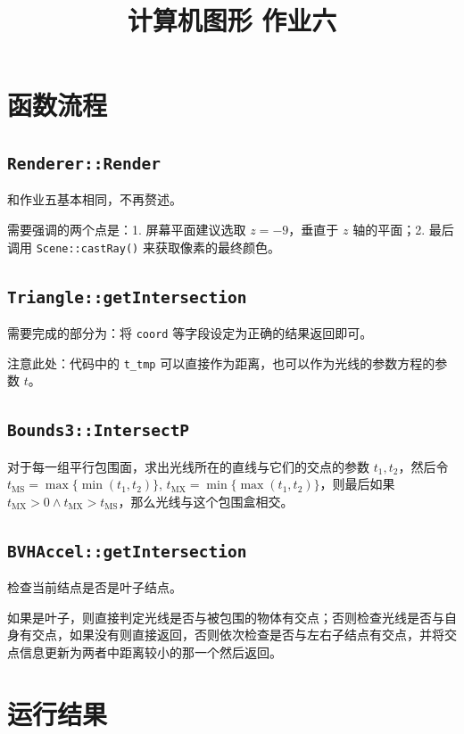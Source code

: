 \documentclass{ctexart}
\title{计算机图形 作业六}
\author{\theauthor}
\begin{document}
    \maketitle

    \section{函数流程}

    \subsection{\texttt{Renderer::Render}}

    和作业五基本相同，不再赘述。

    需要强调的两个点是：1. 屏幕平面建议选取 $z=-9$，垂直于 $z$ 轴的平面；2. 最后调用 \texttt{Scene::castRay()} 来获取像素的最终颜色。

    \subsection{\texttt{Triangle::getIntersection}}

    需要完成的部分为：将 \texttt{coord} 等字段设定为正确的结果返回即可。
    
    注意此处：代码中的 \texttt{t\_tmp} 可以直接作为距离，也可以作为光线的参数方程的参数 $t$。

    \subsection{\texttt{Bounds3::IntersectP}}

    对于每一组平行包围面，求出光线所在的直线与它们的交点的参数 $t_1, t_2$，然后令 $t_\mathrm{MS} = \max\{\min(t_1, t_2)\}$, $t_\mathrm{MX} = \min\{\max(t_1, t_2)\}$，则最后如果 $t_\mathrm{MX} > 0 \land t_\mathrm{MX} > t_\mathrm{MS}$，那么光线与这个包围盒相交。

    \subsection{\texttt{BVHAccel::getIntersection}}

    检查当前结点是否是叶子结点。

    如果是叶子，则直接判定光线是否与被包围的物体有交点；否则检查光线是否与自身有交点，如果没有则直接返回，否则依次检查是否与左右子结点有交点，并将交点信息更新为两者中距离较小的那一个然后返回。

    \section{运行结果}
\end{document}
